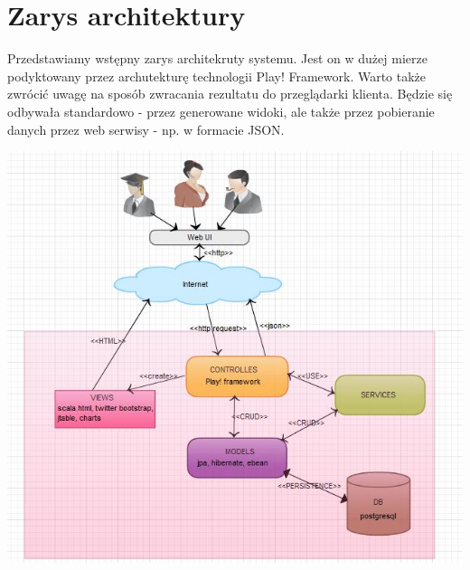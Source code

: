 \documentclass[a4paper,12pt,notitlepage]{mwrep}
\begin{document}
\section{Zarys architektury}
Przedstawiamy wstępny zarys architekruty systemu. Jest on w dużej mierze podyktowany przez archutekturę technologii Play! Framework. 
Warto także zwrócić uwagę na sposób zwracania rezultatu do przeglądarki klienta. Będzie się odbywała standardowo - przez generowane 
widoki, ale także przez pobieranie danych przez web serwisy - np. w formacie JSON.
\begin{center}	
\vspace{4ex}	
	\includegraphics[scale=1.0]{images/tasksArch.jpg} \\
\vspace{4ex}
\end{center}
\end{document}
